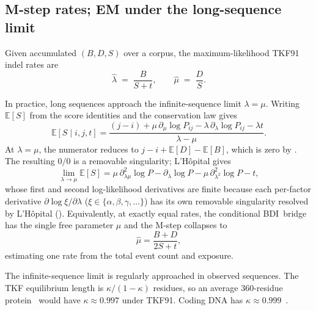 \documentclass{article}
\newcommand{\BDI}{\textsc{BDI}}
\newcommand{\Pfam}{\textsc{Pfam}}
\newcommand{\E}{\mathbb{E}}
\newcommand{\ins}{\lambda}
\newcommand{\del}{\mu}
\begin{document}

\subsection{M-step rates; EM under the long-sequence limit}

Given accumulated $(B,D,S)$ over a corpus, the maximum-likelihood TKF91 indel
rates are
\begin{equation}
\label{eq:mstep}
\hat\ins \;=\; \frac{B}{S+t}, \qquad
\hat\del \;=\; \frac{D}{S}.
\end{equation}

In practice, long sequences approach the infinite-sequence limit $\ins{=}\del$.
Writing $\E[S]$ from the score identities and the conservation law gives
\begin{equation}
\label{eq:ES}
\E[S\mid i,j,t]=\frac{(j-i)+\del\,\partial_\del\log P_{ij}
  -\ins\,\partial_\ins\log P_{ij}-\ins t}{\ins-\del}.
\end{equation}
At $\ins{=}\del$, the numerator reduces to $j-i+\E[D]-\E[B]$, which is zero by
. The resulting $0/0$ is a removable singularity; L'H\^opital gives
\begin{equation}
\label{eq:ES-lhopital}
\lim_{\ins\to\del}\E[S]
  =\del\,\partial^2_{\ins\del}\log P
   -\partial_\ins\log P
   -\del\,\partial^2_{\ins^2}\log P-t,
\end{equation}
whose first and second log-likelihood derivatives are finite because
each per-factor derivative $\partial\log\xi/\partial\ins$
($\xi\in\{\alpha,\beta,\gamma,\dots\}$) has its own removable
singularity resolved by L'H\^opital (). 
Equivalently, at exactly equal
rates, the conditional \BDI\ bridge has the single free parameter $\del$
and the M-step collapses to
\begin{equation}
\label{eq:mstep-equal}
\hat\del=\frac{B+D}{2S+t},
\end{equation}
estimating one rate from the total event count and exposure.

The infinite-sequence limit is regularly approached in observed sequences.
The TKF equilibrium length is $\kappa/(1{-}\kappa)$
residues, so an average $360$-residue protein~\cite{UniProtStatistics}
would have $\kappa\approx0.997$ under TKF91.
Coding DNA has $\kappa\approx0.999$~\cite{XuEtAl2006}.
\end{document}
